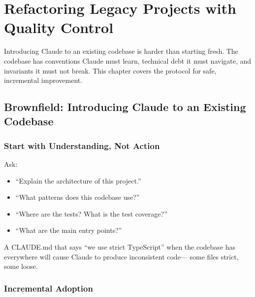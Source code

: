 \chapter{Refactoring Legacy Projects with Quality Control}
\label{ch:refactoring}

Introducing Claude to an existing codebase is harder than starting fresh.
The codebase has conventions Claude must learn, technical debt it must
navigate, and invariants it must not break. This chapter covers the
protocol for safe, incremental improvement.

\section{Brownfield: Introducing Claude to an Existing Codebase}
\label{sec:brownfield}


\subsection{Start with Understanding, Not Action}

Ask:
\begin{itemize}
  \item ``Explain the architecture of this project.''
  \item ``What patterns does this codebase use?''
  \item ``Where are the tests? What is the test coverage?''
  \item ``What are the main entry points?''
\end{itemize}

A CLAUDE.md that says ``we use strict TypeScript'' when the codebase has
 everywhere will cause Claude to produce inconsistent code---
some files strict, some loose.

\subsection{Incremental Adoption}


